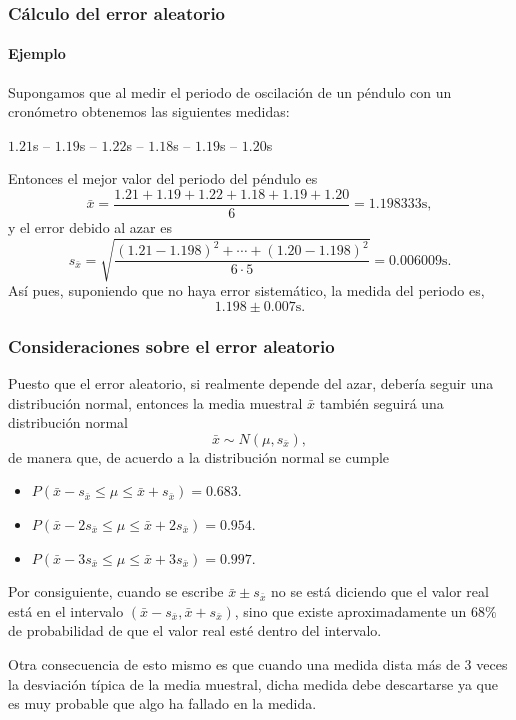 \begin{frame}
\frametitle{Cálculo del error aleatorio}
\framesubtitle{Ejemplo}
Supongamos que al medir el periodo de oscilación de un péndulo con un cronómetro obtenemos las siguientes medidas:
\begin{center}
$1.21$s -- $1.19$s -- $1.22$s -- $1.18$s -- $1.19$s -- $1.20$s
\end{center}

Entonces el mejor valor del periodo del péndulo es 
\[
\bar x = \frac{1.21+1.19+1.22+1.18+1.19+1.20}{6} =  1.198333\mbox{s},
\] 
y el error debido al azar es
\[
s_{\bar x} = \sqrt{\frac{(1.21-1.198)^2+\cdots +(1.20-1.198)^2}{6\cdot 5}} = 0.006009\mbox{s}.
\]
Así pues, suponiendo que no haya error sistemático, la medida del periodo es, 
\[
1.198\pm 0.007\mbox{s}.
\]
\end{frame}


\begin{frame}
\frametitle{Consideraciones sobre el error aleatorio}
Puesto que el error aleatorio, si realmente depende del azar, debería seguir una distribución normal, entonces la media
muestral $\bar x$ también seguirá una distribución normal
\[
\bar x\sim N(\mu,s_{\bar x}),
\]
de manera que, de acuerdo a la distribución normal se cumple
\begin{itemize}
\item $P(\bar x-s_{\bar x}\leq \mu\leq \bar x+s_{\bar x})=0.683$.
\item $P(\bar x-2s_{\bar x}\leq \mu\leq \bar x+2s_{\bar x})=0.954$.
\item $P(\bar x-3s_{\bar x}\leq \mu\leq \bar x+3s_{\bar x})=0.997$.
\end{itemize}

Por consiguiente, cuando se escribe $\bar x\pm s_{\bar x}$ no se está diciendo que el valor real está en el intervalo
$(\bar x-s_{\bar x},\bar x+s_{\bar x})$, sino que existe aproximadamente un $68\%$ de probabilidad de que el valor real
esté dentro del intervalo. 

Otra consecuencia de esto mismo es que cuando una medida dista más de 3 veces la desviación típica de la media
muestral, dicha medida debe descartarse ya que es muy probable que algo ha fallado en la medida. 
\end{frame}


